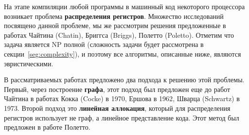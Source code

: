 На этапе компиляции любой программы в машинный код некоторого процессора возникает проблема \textbf{распределения регистров}. %
Множество исследований посвящено данной проблеме, мы же рассмотрим решения предложенные в
работах Чайтина (Chatin)\cite{chaitin1982}, Бриггса (Briggs)\cite{briggs1994}, Полетто (Poletto)\cite{poletto1999}. %
Отметим что задача является NP полной (сложность задачи будет рассмотрена в секции~\ref{seg:complexity}),
и поэтому все алгоритмы, описанные ниже, являются эвристическими.

В рассматриваемых работах предложено два подхода к решению этой проблемы.
Первый, через построение \textbf{графа}, этот подход был предложен еще до работ Чайтина в работах Кокка
(Cocke) в 1970\cite{cocke1970}, Ершова в 1962\cite{ershov1962}, Шварца (Schwartz) в 1973\cite{schwartz1973}. %
Второй подход это \textbf{линейная аллокация}, который для распределения регистров использует не граф,
а линейное представление кода. Этот метод был предложен в работе Полетто.